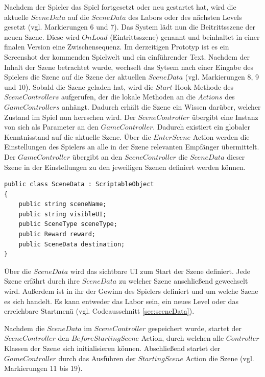 Nachdem der Spieler das Spiel fortgesetzt oder neu gestartet hat, wird die aktuelle $SceneData$ auf die $SceneData$ des Labors oder des nächsten Levels gesetzt (vgl. Markierungen 6 und 7). Das System lädt nun die Beitrittsszene der neuen Szene. Diese wird $OnLoad$ (Eintrittsszene) genannt und beinhaltet in einer finalen Version eine Zwischensequenz. Im derzeitigen Prototyp ist es ein Screenshot der kommenden Spielwelt und ein einführender Text. Nachdem der Inhalt der Szene betrachtet wurde, wechselt das Sytsem nach einer Eingabe des Spielers die Szene auf die Szene der aktuellen $SceneData$ (vgl. Markierungen 8, 9 und 10). Sobald die Szene geladen hat, wird die $Start$-Hook Methode des $SceneControllers$ aufgerufen, der die lokale Methoden an die $Actions$ des $GameControllers$ anhängt. Dadurch erhält die Szene ein Wissen darüber, welcher Zustand im Spiel nun herrschen wird. Der $SceneController$ übergibt eine Instanz von sich als Parameter an den $GameController$. Dadurch existiert ein globaler Kenntnisstand auf die aktuelle Szene. Über die $EnterScene$ Action werden die Einstellungen des Spielers an alle in der Szene relevanten Empfänger übermittelt. Der $GameController$ übergibt an den $SceneController$ die $SceneData$ dieser Szene in der Einstellungen zu den jeweiligen Szenen definiert werden können.

\begin{lstlisting}[caption={SceneData.ts}, label={sec:sceneData}]
public class SceneData : ScriptableObject
{
    public string sceneName;
    public string visibleUI;
    public SceneType sceneType;
    public Reward reward;
    public SceneData destination;
}
\end{lstlisting}

Über die $SceneData$ wird das sichtbare \ac{UI} zum Start der Szene definiert. Jede Szene erfährt durch ihre $SceneData$ zu welcher Szene anschließend gewechselt wird. Außerdem ist in ihr der Gewinn des Spielers definiert und um welche Szene es sich handelt. Es kann entweder das Labor sein, ein neues Level oder das erreichbare Startmenü (vgl. Codeausschnitt \ref{sec:sceneData}).

Nachdem die $SceneData$ im $SceneController$ gespeichert wurde, startet der\\ $SceneController$ den $BeforeStartingScene$ Action, durch welchen alle $Controller$ Klassen der Szene sich initialisieren können. Abschließend startet der $GameController$ durch das Ausführen der $StartingScene$ Action die Szene (vgl. Markierungen 11 bis 19). 

